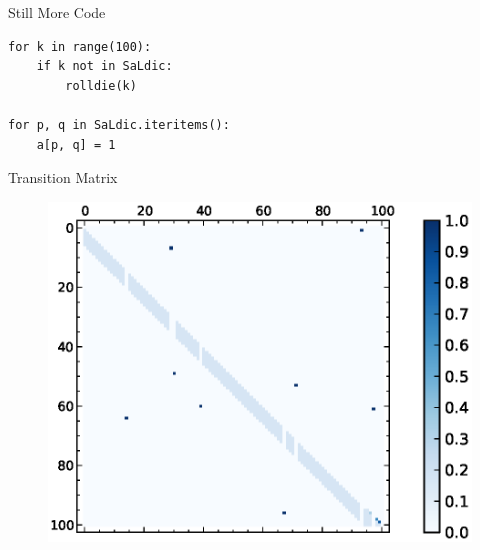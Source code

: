 \documentclass[14pt]{beamer}
\begin{document}
\begin{frame}[fragile]{Still More Code}
  \begin{verbatim}
for k in range(100):
    if k not in SaLdic:
        rolldie(k)

for p, q in SaLdic.iteritems():
    a[p, q] = 1 
  \end{verbatim}
\end{frame}

\begin{frame}{Transition Matrix}
  \begin{figure}[!htbp]
    \begin{center}
      \includegraphics[scale=0.8]{images/matplot}
    \end{center}
  \end{figure}
\end{frame}
\end{document}
